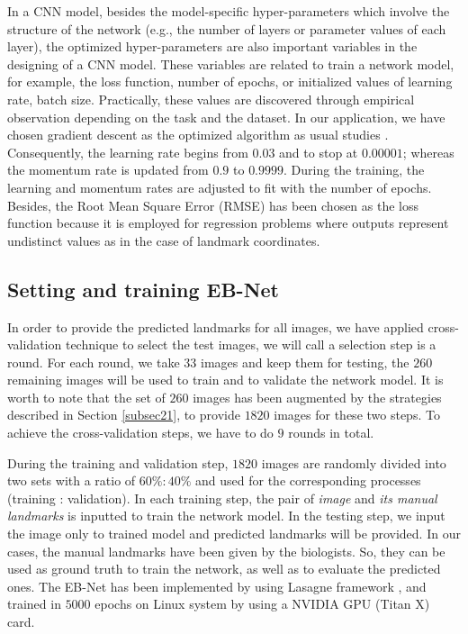\documentclass[review]{elsarticle}
\begin{document}
In a CNN model, besides the model-specific hyper-parameters which involve the structure of the network (e.g., the number of layers or parameter values of each layer), the optimized hyper-parameters are also important variables in the designing of a CNN model. These variables are related to train a network model, for example, the loss function, number of epochs, or initialized values of learning rate, batch size. Practically, these values are discovered through empirical observation depending on the task and the dataset. In our application, we have chosen gradient descent as the optimized algorithm as usual studies \cite{krizhevsky2012imagenet, cintas2016automatic}. Consequently, the learning rate begins from $0.03$ and to stop at $0.00001$; whereas the momentum rate is updated from $0.9$ to $0.9999$. During the training, the learning and momentum rates are adjusted to fit with the number of epochs. Besides, the Root Mean Square Error (RMSE) has been chosen as the loss function because it is employed for regression problems where outputs represent undistinct values as in the case of landmark coordinates.

\subsection{Setting and training EB-Net}
\label{subsec23}
In order to provide the predicted landmarks for all images, we have applied cross-validation technique to select the test images, we will call a selection step is a round. For each round, we take $33$ images and keep them for testing, the $260$ remaining images will be used to train and to validate the network model. It is worth to note that the set of $260$ images has been augmented by the strategies described in Section \ref{subsec21}, to provide $1820$ images for these two steps. To achieve the cross-validation steps, we have to do $9$ rounds in total. 

During the training and validation step, $1820$ images are randomly divided into two sets with a ratio of $60\%:40\%$ and used for the corresponding processes (training : validation). In each training step, the pair of \textit{image} and \textit{its manual landmarks} is inputted to train the network model. In the testing step, we input the image only to trained model and predicted landmarks will be provided. In our cases, the manual landmarks have been given by the biologists. So, they can be used as ground truth to train the network, as well as to evaluate the predicted ones. The EB-Net has been implemented by using Lasagne framework \cite{lasagne}, and trained in $5000$ epochs on Linux system by using a NVIDIA GPU (Titan X) card.
\end{document}
